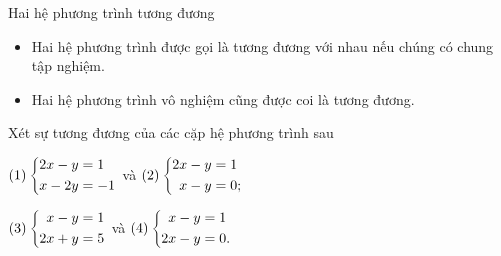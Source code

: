 \begin{dang}{Hai hệ phương trình tương đương}
	\begin{itemize}
		\item Hai hệ phương trình được gọi là tương đương với nhau nếu chúng có chung tập nghiệm.
		\item Hai hệ phương trình vô nghiệm cũng được coi là tương đương.
	\end{itemize}
	
\end{dang}	
\begin{vd}
Xét sự tương đương của các cặp hệ phương trình sau
\begin{enumEX}{1}  
	\item $(1)\left\{\begin{aligned}2x-y&=1\\x-2y&=-1\end{aligned}\right.$ và $(2)\left\{\begin{aligned}2x-y&=1\\x-y&=0;\end{aligned}\right.$
	\item $(3)\left\{\begin{aligned}x-y&=1\\2x+y&=5\end{aligned}\right.$ và $(4)\left\{\begin{aligned}x-y&=1\\2x-y&=0.\end{aligned}\right.$
\end{enumEX}
\end{vd}		
